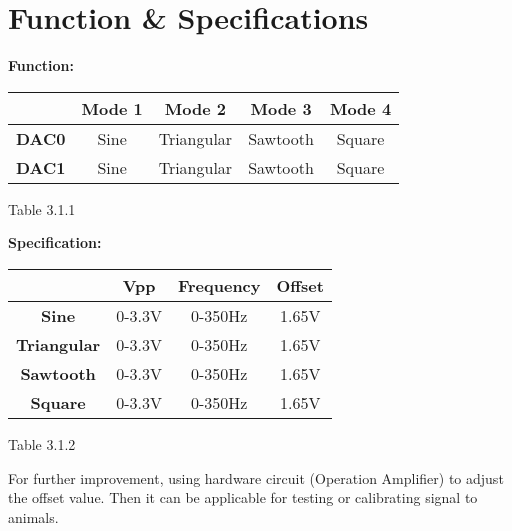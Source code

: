 \documentclass[12pt]{report}
\begin{document}
\section{\large Function \& Specifications}
\textbf{Function:}
  \begin{center}
    \begin{tabular}{||c|c|c|c|c||} \hline
      \  & \textbf{Mode 1} & \textbf{Mode 2} & \textbf{Mode 3} & \textbf{Mode 4}\\ \hline
      \textbf{DAC0} & Sine & Triangular & Sawtooth & Square\\ \hline
      \textbf{DAC1} & Sine & Triangular & Sawtooth & Square\\ \hline
    \end{tabular}
  \end{center}
  \begin{center}
  \textup{\footnotesize Table 3.1.1}
  \end{center}
\textbf{Specification:}
\begin{center}
    \begin{tabular}{||c|c|c|c||} \hline
      \  & \textbf{Vpp} & \textbf{Frequency} & \textbf{Offset}\\ \hline
      \textbf{Sine} & 0-3.3V & 0-350Hz & 1.65V\\ \hline
      \textbf{Triangular} & 0-3.3V & 0-350Hz & 1.65V\\ \hline
      \textbf{Sawtooth} & 0-3.3V & 0-350Hz & 1.65V\\ \hline
      \textbf{Square} & 0-3.3V & 0-350Hz & 1.65V\\ \hline
    \end{tabular}
  \end{center}
  \begin{center}
  \textup{\footnotesize Table 3.1.2}
  \end{center}
\textup{For further improvement, using hardware circuit (Operation Amplifier) to adjust the offset value. Then it can be applicable for testing or calibrating signal to animals.}
\newpage
\end{document}
